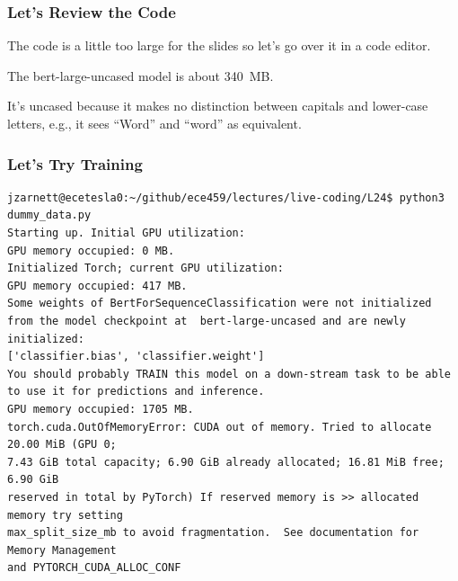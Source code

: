 \begin{frame}
\frametitle{Let's Review the Code}

The code is a little too large for the slides so let's go over it in a code editor.


The bert-large-uncased model is about 340~MB.

It's uncased because it makes no distinction between capitals and lower-case letters, e.g., it sees ``Word'' and ``word'' as equivalent.

\end{frame}

\begin{frame}[fragile]
\frametitle{Let's Try Training}

{\scriptsize
\begin{verbatim}
jzarnett@ecetesla0:~/github/ece459/lectures/live-coding/L24$ python3 dummy_data.py 
Starting up. Initial GPU utilization:
GPU memory occupied: 0 MB.
Initialized Torch; current GPU utilization:
GPU memory occupied: 417 MB.
Some weights of BertForSequenceClassification were not initialized 
from the model checkpoint at  bert-large-uncased and are newly initialized: 
['classifier.bias', 'classifier.weight']
You should probably TRAIN this model on a down-stream task to be able 
to use it for predictions and inference.
GPU memory occupied: 1705 MB.
torch.cuda.OutOfMemoryError: CUDA out of memory. Tried to allocate 20.00 MiB (GPU 0; 
7.43 GiB total capacity; 6.90 GiB already allocated; 16.81 MiB free; 6.90 GiB 
reserved in total by PyTorch) If reserved memory is >> allocated memory try setting 
max_split_size_mb to avoid fragmentation.  See documentation for Memory Management
and PYTORCH_CUDA_ALLOC_CONF
\end{verbatim}
}

\end{frame}

